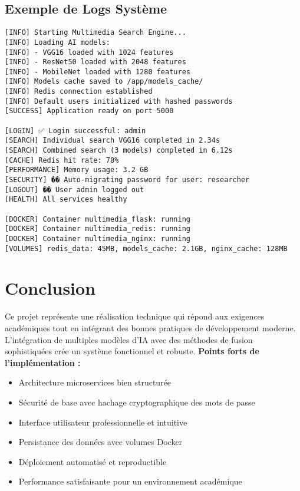 \documentclass[12pt,a4paper]{article}
\begin{document}
\subsection{Exemple de Logs Système}

\begin{lstlisting}[caption=Logs de fonctionnement du système]
[INFO] Starting Multimedia Search Engine...
[INFO] Loading AI models:
[INFO] - VGG16 loaded with 1024 features
[INFO] - ResNet50 loaded with 2048 features  
[INFO] - MobileNet loaded with 1280 features
[INFO] Models cache saved to /app/models_cache/
[INFO] Redis connection established
[INFO] Default users initialized with hashed passwords
[SUCCESS] Application ready on port 5000

[LOGIN] ✅ Login successful: admin
[SEARCH] Individual search VGG16 completed in 2.34s
[SEARCH] Combined search (3 models) completed in 6.12s
[CACHE] Redis hit rate: 78%
[PERFORMANCE] Memory usage: 3.2 GB
[SECURITY] �� Auto-migrating password for user: researcher
[LOGOUT] �� User admin logged out
[HEALTH] All services healthy

[DOCKER] Container multimedia_flask: running
[DOCKER] Container multimedia_redis: running  
[DOCKER] Container multimedia_nginx: running
[VOLUMES] redis_data: 45MB, models_cache: 2.1GB, nginx_cache: 128MB
\end{lstlisting}

\section{Conclusion}
Ce projet représente une réalisation technique qui répond aux exigences académiques tout en intégrant des bonnes pratiques de développement moderne. L'intégration de multiples modèles d'IA avec des méthodes de fusion sophistiquées crée un système fonctionnel et robuste.
\textbf{Points forts de l'implémentation :}
\begin{itemize}
  \item Architecture microservices bien structurée
  \item Sécurité de base avec hachage cryptographique des mots de passe
  \item Interface utilisateur professionnelle et intuitive
  \item Persistance des données avec volumes Docker
  \item Déploiement automatisé et reproductible
  \item Performance satisfaisante pour un environnement académique
\end{itemize}
\end{document}
